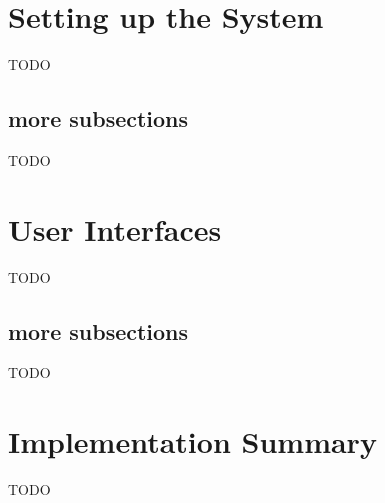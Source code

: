 \section{Setting up the System}
TODO
\subsection{more subsections}
TODO
\section{User Interfaces}
TODO
\subsection{more subsections}
TODO
\section{Implementation Summary}
TODO